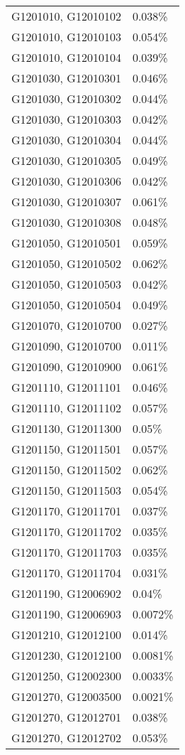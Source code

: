 \begin{longtable}[]{@{}ll@{}}
G1201010, G12010102 & 0.038\% \\
G1201010, G12010103 & 0.054\% \\
G1201010, G12010104 & 0.039\% \\
G1201030, G12010301 & 0.046\% \\
G1201030, G12010302 & 0.044\% \\
G1201030, G12010303 & 0.042\% \\
G1201030, G12010304 & 0.044\% \\
G1201030, G12010305 & 0.049\% \\
G1201030, G12010306 & 0.042\% \\
G1201030, G12010307 & 0.061\% \\
G1201030, G12010308 & 0.048\% \\
G1201050, G12010501 & 0.059\% \\
G1201050, G12010502 & 0.062\% \\
G1201050, G12010503 & 0.042\% \\
G1201050, G12010504 & 0.049\% \\
G1201070, G12010700 & 0.027\% \\
G1201090, G12010700 & 0.011\% \\
G1201090, G12010900 & 0.061\% \\
G1201110, G12011101 & 0.046\% \\
G1201110, G12011102 & 0.057\% \\
G1201130, G12011300 & 0.05\% \\
G1201150, G12011501 & 0.057\% \\
G1201150, G12011502 & 0.062\% \\
G1201150, G12011503 & 0.054\% \\
G1201170, G12011701 & 0.037\% \\
G1201170, G12011702 & 0.035\% \\
G1201170, G12011703 & 0.035\% \\
G1201170, G12011704 & 0.031\% \\
G1201190, G12006902 & 0.04\% \\
G1201190, G12006903 & 0.0072\% \\
G1201210, G12012100 & 0.014\% \\
G1201230, G12012100 & 0.0081\% \\
G1201250, G12002300 & 0.0033\% \\
G1201270, G12003500 & 0.0021\% \\
G1201270, G12012701 & 0.038\% \\
G1201270, G12012702 & 0.053\% \\

\end{longtable}
